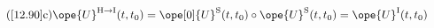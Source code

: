 \begin{equation}\tag{\ref{12.90}c}	\label{12.90c}
\ope{U}^{\mathrm{H}\to\mathrm{I}}(t,t_0)
=
\ope[0]{U}^{\mathrm{S}}(t,t_0) \circ \ope{U}^{\mathrm{S}}(t,t_0)
=
\ope{U}^{\mathrm{I}}(t,t_0)
	\end{equation}

